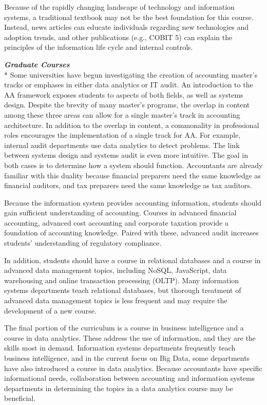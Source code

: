 \documentclass[12pt]{article}
\newcommand{\SubSubSection}[1]{{\centering{}\normalsize{}\textbf{\emph{#1}}}\\*\indent{}}
\begin{document}
Because of the rapidly changing landscape of technology and information systems, a traditional textbook may not be the best foundation for this course. Instead, news articles can educate individuals regarding new technologies and adoption trends, and other publications (e.g., COBIT 5) can explain the principles of the information life cycle and internal controls.

\SubSubSection{Graduate Courses}
Some universities have begun investigating the creation of accounting master's tracks or emphases in either data analytics or IT audit. An introduction to the AA framework exposes students to aspects of both fields, as well as systems design. Despite the brevity of many master's programs, the overlap in content among these three areas can allow for a single master's track in accounting architecture. In addition to the overlap in content, a commonality in professional roles encourages the implementation of a single track for AA. For example, internal audit departments use data analytics to detect problems. The link between systems design and systems audit is even more intuitive. The goal in both cases is to determine how a system should function. Accountants are already familiar with this duality because financial preparers need the same knowledge as financial auditors, and tax preparers need the same knowledge as tax auditors.

Because the information system provides accounting information, students should gain sufficient understanding of accounting. Courses in advanced financial accounting, advanced cost accounting and corporate taxation provide a foundation of accounting knowledge. Paired with these, advanced audit increases students' understanding of regulatory compliance.

In addition, students should have a course in relational databases and a course in advanced data management topics, including NoSQL, JavaScript, data warehousing and online transaction processing (OLTP). Many information systems departments teach relational databases, but thorough treatment of advanced data management topics is less frequent and may require the development of a new course.

The final portion of the curriculum is a course in business intelligence and a course in data analytics. These address the use of information, and they are the skills most in demand. Information systems departments frequently teach business intelligence, and in the current focus on Big Data, some departments have also introduced a course in data analytics. Because accountants have specific informational needs, collaboration between accounting and information systems departments in determining the topics in a data analytics course may be beneficial.
\end{document}
